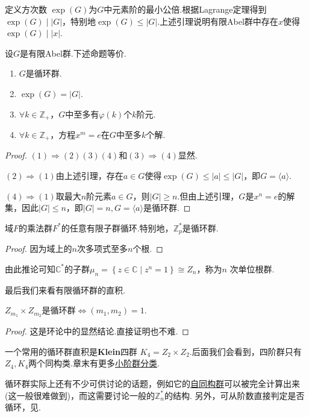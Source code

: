 定义{\heiti 方次数} $\exp(G)$为$G$中元素阶的最小公倍.根据Lagrange定理得到$\exp(G)\mid|G|$，特别地$\exp(G)\le |G|$.上述引理说明有限Abel群中存在$x$使得$\exp(G)\mid|x|$.
\begin{thm}
	设$G$是有限Abel群.下述命题等价.
	\begin{enumerate}
		\item $G$是循环群.
		\item $\exp(G)=|G|$.
		\item $\forall k\in\mathbb{Z}_+$，$G$中至多有$\varphi(k)$个$k$阶元.
		\item $\forall k\in\mathbb{Z}_+$，方程$x^m=e$在$G$中至多$k$个解.
	\end{enumerate}
\end{thm}
\begin{proof}
	\hspace*{5.4pt}$(1)\Rightarrow(2)(3)(4)$和$(3)\Rightarrow(4)$显然.

	$(2)\Rightarrow(1)$由上述引理，存在$a\in G$使得$\exp(G)\le|a|\le|G|$，即$G=\langle a\rangle $.

	$(4)\Rightarrow(1)$取最大$n$阶元素$a\in G$，则$|G|\ge n$.但由上述引理，$G$是$x^n=e$的解集，因此$|G|\le n$，即$|G|=n,G=\langle a\rangle $是循环群.
\end{proof}
\begin{cor}
	域$F$的乘法群$F^*$的任意有限子群循环.特别地，$\mathbb{Z}_p^*$是循环群.
\end{cor}
\begin{proof}
	因为域上的$n$次多项式至多$n$个根.
\end{proof}

由此推论可知$\mathbb{C}^*$的子群$\mu_n=\left\{z\in\mathbb{C}\mid z^n=1\right\}\cong Z_n$，称为$n$ {\heiti 次单位根群}.

最后我们来看有限循环群的直积.
\begin{prop}
	$Z_{m_1}\times Z_{m_2}$是循环群$\Leftrightarrow(m_1,m_2)=1$.
\end{prop}
\begin{proof}
	这是环论中的显然结论.直接证明也不难.
\end{proof}

一个常用的循环群直积是{\heiti \textbf{Klein}四群} $K_4=Z_2\times Z_2$.后面我们会看到，四阶群只有$Z_4,K_4$两个同构类.章末有更多\hyperref[subsec:ClassificationSmallOrder]{小阶群分类}.

\begin{remark}
	循环群实际上还有不少可供讨论的话题，例如它的\hyperlink{prop:CyclicAuto}{自同构群}可以被完全计算出来(这一般很难做到)，而这需要讨论一般的$\mathbb{Z}_n^*$的结构.
	另外，可从阶数直接判定是否循环，见.%
\end{remark}

